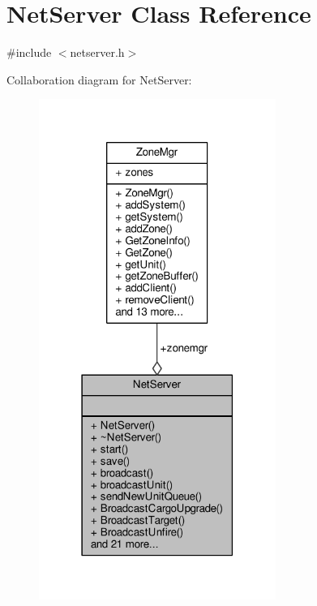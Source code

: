 \hypertarget{classNetServer}{}\section{Net\+Server Class Reference}
\label{classNetServer}


{\ttfamily \#include $<$netserver.\+h$>$}



Collaboration diagram for Net\+Server\+:
\nopagebreak
\begin{figure}[H]
\begin{center}
\leavevmode
\includegraphics[width=219pt]{dd/d6e/classNetServer__coll__graph}
\end{center}
\end{figure}

